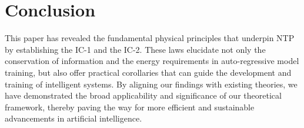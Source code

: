 \documentclass{article}
\theoremstyle{plain}
\theoremstyle{definition}
\theoremstyle{remark}
\begin{document}
\section{Conclusion}

This paper has revealed the fundamental physical principles that underpin NTP by establishing the IC-1 and the IC-2. These laws elucidate not only the conservation of information and the energy requirements in auto-regressive model training, but also offer practical corollaries that can guide the development and training of intelligent systems. By aligning our findings with existing theories, we have demonstrated the broad applicability and significance of our theoretical framework, thereby paving the way for more efficient and sustainable advancements in artificial intelligence.







\end{document}
